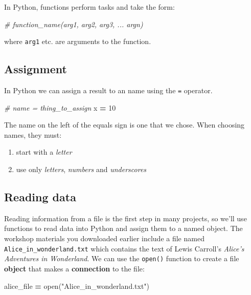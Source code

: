 \documentclass[
]{book}
\newenvironment{Shaded}{\begin{snugshade}}{\end{snugshade}}
\newcommand{\BuiltInTok}[1]{#1}
\newcommand{\CommentTok}[1]{\textcolor[rgb]{0.56,0.35,0.01}{\textit{#1}}}
\newcommand{\DecValTok}[1]{\textcolor[rgb]{0.00,0.00,0.81}{#1}}
\newcommand{\NormalTok}[1]{#1}
\newcommand{\OperatorTok}[1]{\textcolor[rgb]{0.81,0.36,0.00}{\textbf{#1}}}
\newcommand{\StringTok}[1]{\textcolor[rgb]{0.31,0.60,0.02}{#1}}
\providecommand{\tightlist}{%
  \setlength{\itemsep}{0pt}\setlength{\parskip}{0pt}}
\begin{document}
In Python, functions perform tasks and take the form:

\begin{Shaded}
\begin{Highlighting}[]
\CommentTok{# function_name(arg1, arg2, arg3, ... argn)}
\end{Highlighting}
\end{Shaded}

where \texttt{arg1} etc. are arguments to the function.

\hypertarget{assignment-1}{%
\subsection{Assignment}\label{assignment-1}}

In Python we can assign a result to an name using the \texttt{=} operator.

\begin{Shaded}
\begin{Highlighting}[]
\CommentTok{# name = thing_to_assign}
\NormalTok{x }\OperatorTok{=} \DecValTok{10}
\end{Highlighting}
\end{Shaded}

The name on the left of the equals sign is one that we chose. When choosing names, they must:

\begin{enumerate}
\def\labelenumi{\arabic{enumi}.}
\tightlist
\item
  start with a \emph{letter}
\item
  use only \emph{letters}, \emph{numbers} and \emph{underscores}
\end{enumerate}

\hypertarget{reading-data-1}{%
\subsection{Reading data}\label{reading-data-1}}

Reading information from a file is the first step in many projects, so we'll use functions to read data into Python and assign them to a named object. The workshop materials you downloaded earlier include a file named \texttt{Alice\_in\_wonderland.txt} which contains the text of Lewis Carroll's \emph{Alice's Adventures in Wonderland}. We can use the \texttt{open()} function to create a file \textbf{object} that makes a \textbf{connection} to the file:

\begin{Shaded}
\begin{Highlighting}[]
\NormalTok{alice_file }\OperatorTok{=} \BuiltInTok{open}\NormalTok{(}\StringTok{"Alice_in_wonderland.txt"}\NormalTok{)}
\end{Highlighting}
\end{Shaded}
\end{document}
